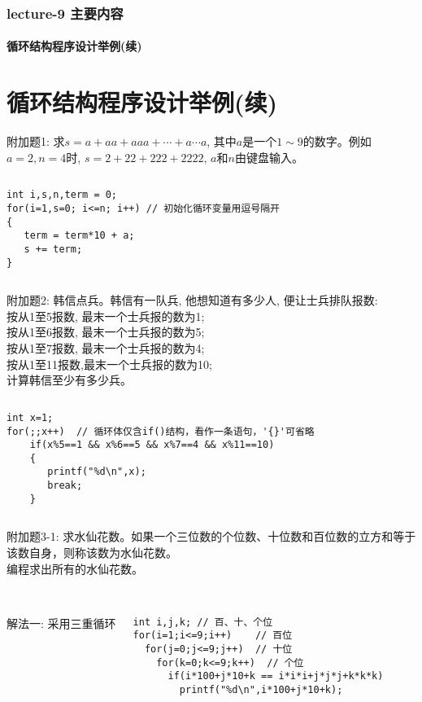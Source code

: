 \begin{frame}[shrink]
  \frametitle{lecture-9 主要内容}
  \framesubtitle{循环结构程序设计举例(续)}
  \tableofcontents[hideallsubsections]
\end{frame}

\section{循环结构程序设计举例(续)}

\begin{frame}[fragile]
附加题1: 求$s=a+aa+aaa+\cdots+a\cdots a$, 其中$a$是一个$1\sim 9$的数字。例如$a=2, n=4$时, $s=2+22+222+2222$, $a$和$n$由键盘输入。
\pause
\begin{columns}
\begin{lstlisting}
int i,s,n,term = 0;
for(i=1,s=0; i<=n; i++) // 初始化循环变量用逗号隔开
{
   term = term*10 + a;
   s += term; 
}
\end{lstlisting}
\end{columns}
\end{frame}

\begin{frame}[fragile]
\small
附加题2: 韩信点兵。韩信有一队兵, 他想知道有多少人, 便让士兵排队报数:\\
按从1至5报数, 最末一个士兵报的数为1;\\
按从1至6报数, 最末一个士兵报的数为5;\\
按从1至7报数, 最末一个士兵报的数为4;\\
按从1至11报数,最末一个士兵报的数为10;\\ 
计算韩信至少有多少兵。 
\pause
\begin{columns}
\begin{lstlisting}
int x=1;
for(;;x++)  // 循环体仅含if()结构，看作一条语句，'{}'可省略
    if(x%5==1 && x%6==5 && x%7==4 && x%11==10)
    { 
       printf("%d\n",x);  
       break;
    }
\end{lstlisting}
\end{columns}
\end{frame}

\begin{frame}[fragile]
附加题3-1: 求水仙花数。如果一个三位数的个位数、十位数和百位数的立方和等于该数自身，则称该数为水仙花数。 \\
编程求出所有的水仙花数。\\
~\\  
\pause
\begin{columns}
解法一: 采用三重循环
\begin{lstlisting}
int i,j,k; // 百、十、个位
for(i=1;i<=9;i++)    // 百位
  for(j=0;j<=9;j++)  // 十位
    for(k=0;k<=9;k++)  // 个位
      if(i*100+j*10+k == i*i*i+j*j*j+k*k*k)  
        printf("%d\n",i*100+j*10+k);
\end{lstlisting}
\end{columns}
\end{frame}

